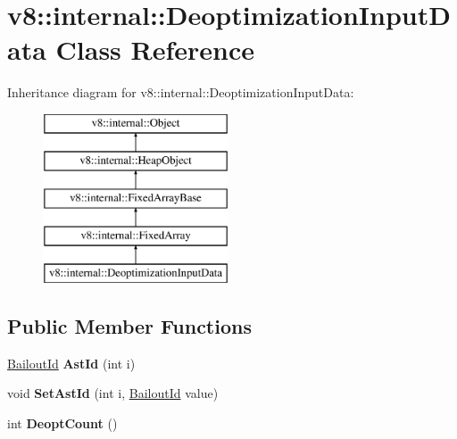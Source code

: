 \hypertarget{classv8_1_1internal_1_1_deoptimization_input_data}{}\section{v8\+:\+:internal\+:\+:Deoptimization\+Input\+Data Class Reference}
\label{classv8_1_1internal_1_1_deoptimization_input_data}
Inheritance diagram for v8\+:\+:internal\+:\+:Deoptimization\+Input\+Data\+:\begin{figure}[H]
\begin{center}
\leavevmode
\includegraphics[height=5.000000cm]{classv8_1_1internal_1_1_deoptimization_input_data}
\end{center}
\end{figure}
\subsection*{Public Member Functions}
\begin{DoxyCompactItemize}
\item 
\hyperlink{classv8_1_1internal_1_1_bailout_id}{Bailout\+Id} {\bfseries Ast\+Id} (int i)\hypertarget{classv8_1_1internal_1_1_deoptimization_input_data_a6e55f0971340b1c28b951a930438db2a}{}\label{classv8_1_1internal_1_1_deoptimization_input_data_a6e55f0971340b1c28b951a930438db2a}

\item 
void {\bfseries Set\+Ast\+Id} (int i, \hyperlink{classv8_1_1internal_1_1_bailout_id}{Bailout\+Id} value)\hypertarget{classv8_1_1internal_1_1_deoptimization_input_data_a798ba9707bc798f3da80f8dd422609e3}{}\label{classv8_1_1internal_1_1_deoptimization_input_data_a798ba9707bc798f3da80f8dd422609e3}

\item 
int {\bfseries Deopt\+Count} ()\hypertarget{classv8_1_1internal_1_1_deoptimization_input_data_a863833fedc035ce852640d71a51b8ca7}{}\label{classv8_1_1internal_1_1_deoptimization_input_data_a863833fedc035ce852640d71a51b8ca7}

\end{DoxyCompactItemize}
